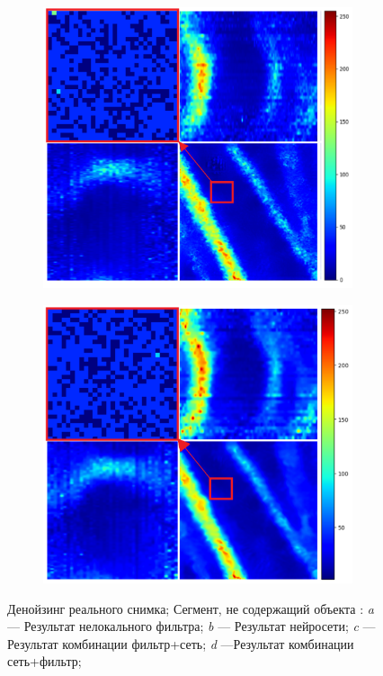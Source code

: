 \begin{figure}[H]
\begin{subfigure}[t]{\dimexpr.5\linewidth-0.7em\relax}
	\end{subfigure}
	\\[20pt]
	\begin{subfigure}[t]{\dimexpr.5\linewidth-0.7em\relax}
		\centering
		\includegraphics[width=.55\linewidth,valign=t]{my_folder/images/denoising/nlm_n2n_part_color.png}
	\end{subfigure}%
	\hfill %
	\begin{subfigure}[t]{\dimexpr.5\linewidth-0.7em\relax}
		\centering
		\includegraphics[width=.55\linewidth,valign=t]{my_folder/images/denoising/n2n_nlm_part_color.png}
	\end{subfigure}
	\captionsetup{justification=centering} %
	\caption{Денойзинг реального снимка; Сегмент, не содержащий объекта : {\itshape a} --- Результат нелокального фильтра; {\itshape b} --- Результат нейросети; {\itshape c} --- Результат комбинации фильтр+сеть; {\itshape d} ---Результат комбинации сеть+фильтр;} 
	\label{fig:real-segment}
\end{figure}
